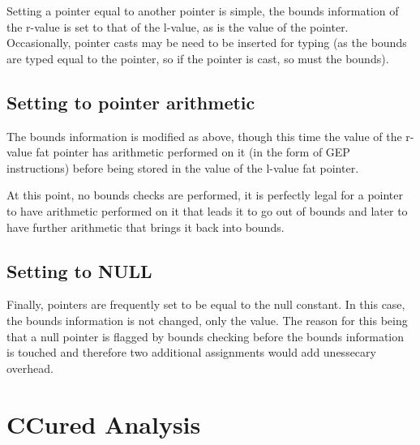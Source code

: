 Setting a pointer equal to another pointer is simple, the bounds information of the r-value is set to that of the l-value, as is the value of the pointer.
Occasionally, pointer casts may be need to be inserted for typing (as the bounds are typed equal to the pointer, so if the pointer is cast, so must the bounds).

\subsection{Setting to pointer arithmetic}

The bounds information is modified as above, though this time the value of the r-value fat pointer has arithmetic performed on it (in the form of GEP instructions) before being stored in the value of the l-value fat pointer.

At this point, no bounds checks are performed, it is perfectly legal for a pointer to have arithmetic performed on it that leads it to go out of bounds and later to have further arithmetic that brings it back into bounds.

\subsection{Setting to NULL}

Finally, pointers are frequently set to be equal to the null constant.
In this case, the bounds information is not changed, only the value.
The reason for this being that a null pointer is flagged by bounds checking before the bounds information is touched and therefore two additional assignments would add unessecary overhead.

\section{CCured Analysis}

